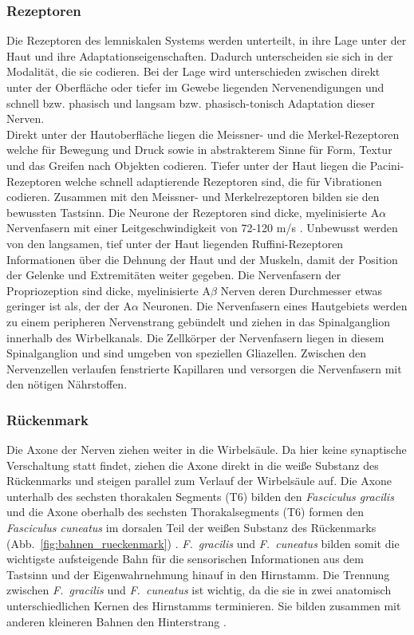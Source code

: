 \documentclass[12pt,a4paper,pdftex]{article}
\begin{document}
\subsubsection*{Rezeptoren}
Die Rezeptoren des lemniskalen Systems werden unterteilt, in ihre Lage unter der Haut und ihre Adaptationseigenschaften. Dadurch unterscheiden sie sich in der Modalität, die sie codieren. Bei der Lage wird unterschieden zwischen direkt unter der Oberfläche oder tiefer im Gewebe liegenden Nervenendigungen und schnell bzw. phasisch und langsam bzw. phasisch-tonisch Adaptation dieser Nerven.\\
Direkt unter der Hautoberfläche liegen die Meissner- und die Merkel-Rezeptoren welche für Bewegung und Druck sowie in abstrakterem Sinne für Form, Textur und das Greifen nach Objekten codieren. \cite[Kap.~24]{paxinos2014rat} Tiefer unter der Haut liegen die Pacini-Rezeptoren welche schnell adaptierende Rezeptoren sind, die für Vibrationen codieren. Zusammen mit den Meissner- und Merkelrezeptoren bilden sie den bewussten Tastsinn. Die Neurone der Rezeptoren sind dicke, myelinisierte A$\alpha$ Nervenfasern mit einer Leitgeschwindigkeit von 72-120 m/s \cite[Kap.~22]{kandel2013principles}. Unbewusst werden von den langsamen, tief unter der Haut liegenden Ruffini-Rezeptoren Informationen über die Dehnung der Haut und der Muskeln, damit der Position der Gelenke und Extremitäten weiter gegeben.
Die Nervenfasern der Propriozeption sind dicke, myelinisierte A$\beta$ Nerven deren Durchmesser etwas geringer ist als, der der A$\alpha$ Neuronen.
Die Nervenfasern eines Hautgebiets werden zu einem peripheren Nervenstrang gebündelt und ziehen in das Spinalganglion innerhalb des Wirbelkanals. Die Zellkörper der Nervenfasern liegen in diesem Spinalganglion und sind umgeben von speziellen Gliazellen. Zwischen den Nervenzellen verlaufen fenstrierte Kapillaren und versorgen die Nervenfasern mit den nötigen Nährstoffen. 

\subsubsection*{Rückenmark}
Die Axone der Nerven ziehen weiter in die Wirbelsäule. Da hier keine synaptische Verschaltung statt findet, ziehen die Axone direkt in die weiße Substanz des Rückenmarks und steigen parallel zum Verlauf der Wirbelsäule auf. Die Axone unterhalb des sechsten thorakalen Segments (T6) bilden den \textit{Fasciculus gracilis}  und die Axone oberhalb des sechsten Thorakalsegments (T6) formen den \textit{Fasciculus cuneatus}  im dorsalen Teil der weißen Substanz des Rückenmarks (Abb.~\ref{fig:bahnen_rueckenmark}) \cite[Kap.~8]{paxinos2014rat}. \textit{F.~gracilis} und \textit{F.~cuneatus} bilden somit die wichtigste aufsteigende Bahn für die sensorischen Informationen aus dem Tastsinn und der Eigenwahrnehmung hinauf in den Hirnstamm. 
Die Trennung zwischen \textit{F.~gracilis} und \textit{F.~cuneatus} ist wichtig, da die sie in zwei anatomisch unterschiedlichen Kernen des Hirnstamms terminieren. Sie bilden zusammen mit anderen kleineren Bahnen den Hinterstrang \cite[Kap.~22]{kandel2013principles}. 
\end{document}
